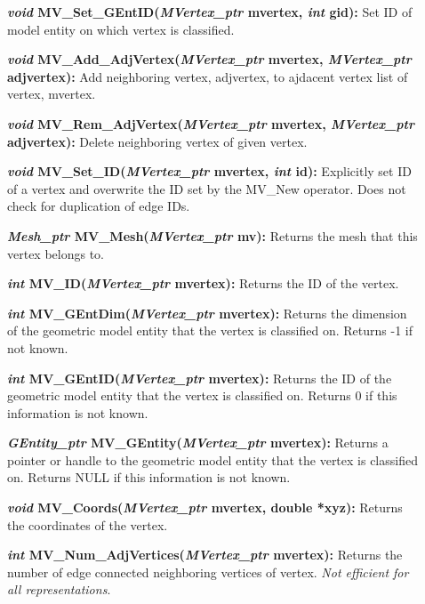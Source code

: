 \documentclass[12pt]{article}
\begin{document}
\begin{description}
\item[]{\bf {\em void} MV\_Set\_GEntID({\em MVertex\_ptr} mvertex,
{\em int} gid):} Set ID of model entity on which vertex is
classified.

\item[]{\bf {\em void} MV\_Add\_AdjVertex({\em MVertex\_ptr}
mvertex, {\em MVertex\_ptr} adjvertex):} Add neighboring vertex,
adjvertex, to ajdacent vertex list of vertex, mvertex.

\item[]{\bf {\em void} MV\_Rem\_AdjVertex({\em MVertex\_ptr}
mvertex, {\em MVertex\_ptr} adjvertex):} Delete neighboring vertex
of given vertex.

\item[]{\bf {\em void} MV\_Set\_ID({\em MVertex\_ptr} mvertex,
{\em int} id):} Explicitly set ID of a vertex and overwrite the ID
set by the MV\_New operator. Does not check for duplication of edge
IDs.

\item[]

\item[]{\bf {\em Mesh\_ptr} MV\_Mesh({\em MVertex\_ptr} mv):}
Returns the mesh that this vertex belongs to.

\item[]{\bf {\em int} MV\_ID({\em MVertex\_ptr} mvertex):} Returns
the ID of the vertex. 

\item[]{\bf {\em int} MV\_GEntDim({\em MVertex\_ptr} mvertex):}
Returns the dimension of the geometric model entity that the vertex is
classified on. Returns -1 if not known.

\item[]{\bf {\em int} MV\_GEntID({\em MVertex\_ptr} mvertex):}
Returns the ID of the geometric model entity that the vertex is
classified on. Returns 0 if this information is not known.

\item[]{\bf {\em GEntity\_ptr} MV\_GEntity({\em MVertex\_ptr}
  mvertex):} Returns a pointer or handle to the geometric model entity
  that the vertex is classified on. Returns NULL if this information
  is not known.

\item[]{\bf {\em void} MV\_Coords({\em MVertex\_ptr} mvertex,
double *xyz):} Returns the coordinates of the vertex.

\item[]

\item[]{\bf {\em int} MV\_Num\_AdjVertices({\em MVertex\_ptr}
mvertex):} Returns the number of edge connected neighboring vertices of
vertex. {\em Not efficient for all representations}.


\end{description}
\end{document}
